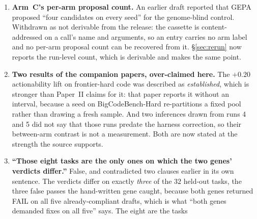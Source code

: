 \documentclass[11pt]{article}
\begin{document}
\begin{enumerate}
    error of $0.018706$ and $|t| = 1.1226$, so the published $1.12$ was exactly the withdrawn
    estimator, $1.0041 \times \sqrt{5/4}$, surviving in prose while the whole of
    Table~\ref{tab:repeat} had moved to the sample-sd convention. The verdict is unaffected,
    $1.00$ and $1.12$ are both far under $t(4) = 2.132$, and that is why it survived: nothing
    turned on it, so nothing checked it. \textbf{A register that certifies its own correction as
    complete is making a claim, and this one falsified itself.} Both sites now print $1.00$.
    Paper~II's register cites this entry as the first of two sites with one signature: a value
    derived from $\sigma$ rather than printed as $\sigma$, so searching for the denominator does
    not find it. We added this entry on 2026-08-12, a week after the fix, having been found by
    following that citation back and discovering it pointed at nothing, which is one more
    instance of the class, and is recorded as one rather than tidied away.
  \item \textbf{Arm~C's per-arm proposal count.} An earlier draft reported that GEPA proposed
    ``four candidates on every seed'' for the genome-blind control. Withdrawn as not derivable from
    the release: the cassette is content-addressed on a call's name and arguments, so an entry
    carries no arm label and no per-arm proposal count can be recovered from it. \S\ref{sec:rerun}
    now reports the run-level count, which is derivable and makes the same point.
  \item \textbf{Two results of the companion papers, over-claimed here.} The $+0.20$
    actionability lift on frontier-hard code was described as \emph{established}, which is stronger
    than Paper~II claims for it: that paper reports it without an interval, because a seed on
    BigCodeBench-Hard re-partitions a fixed pool rather than drawing a fresh sample. And two
    inferences drawn from runs 4 and 5 did not say that those runs predate the harness correction,
    so their between-arm contrast is not a measurement. Both are now stated at the strength the
    source supports.
  \item \textbf{``Those eight tasks are the only ones on which the two genes' verdicts differ.''}
    False, and contradicted two clauses earlier in its own sentence. The verdicts differ on
    exactly \emph{three} of the $32$ held-out tasks, the three false passes the hand-written
    gene caught, because both genes returned FAIL on all five already-compliant drafts, which
    is what ``both genes demanded fixes on all five'' says. The eight are the tasks

\end{enumerate}
\end{document}
